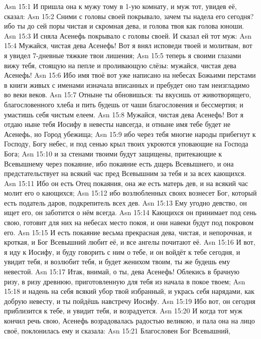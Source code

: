 \vs Asn 15:1
И пришла она к мужу тому в 1-ую комнату,
и муж тот, увидев её, сказал:
\vs Asn 15:2
Сними с головы своей покрывало,
зачем ты надела его сегодня?
ибо ты до сей поры чистая и скромная дева,
и голова твоя как голова юноши.
\vs Asn 15:3
И сняла Асенефь покрывало с головы своей.
И сказал ей тот муж:
\vs Asn 15:4
Мужайся, чистая дева Асенефь!
Вот я внял исповеди твоей и молитвам,
вот я увидел 7-дневные тяжкие твои лишения;
\vs Asn 15:5
теперь я своими глазами вижу тебя,
стоящую на пепле и проливающую слёзы:
мужайся, чистая дева Асенефь!
\vs Asn 15:6
Ибо имя твоё вот уже написано
на небесах Божьими перстами
в книги живых с именами изначала вписанных
и пребудет оно там неизгладимо во веки веков.
\vs Asn 15:7
Отныне ты обновишься:
ты вкусишь от животворящего,
благословенного хлеба
и пить будешь от чаши благословения
и бессмертия;
и умастишь себя чистым елеем.
\vs Asn 15:8
Мужайся, чистая дева Асенефь!
Вот я отдаю ныне тебя Иосифу в невесты навсегда,
и отныне имя тебе будет не Асенефь, но Город убежища;
\vs Asn 15:9
ибо через тебя многие народы прибегнут к Господу,
Богу небес, и под сенью крыл твоих укроются
уповающие на Господа Бога;
\vs Asn 15:10
и за стенами твоими будут защищены,
притекающие к Всевышнему через покаяние,
ибо покаяние есть дщерь Всевышнего,
и она предстательствует на всякий час
пред Всевышним за тебя и за всех кающихся.
\vs Asn 15:11
Ибо он есть Отец покаяния,
она же есть матерь дев, и на всякий час молит его о кающихся;
\vs Asn 15:12
ибо возлюбленных своих
вознесет Бог, который есть податель даров, подкрепитель всех дев.
\vs Asn 15:13
Ему угодно девство, он ищет его,
он заботится о нём всегда.
\vs Asn 15:14
Кающихся он принимает под сень свою,
готовит для них на небесах место покоя, и они навеки будут под
покровом его.
\vs Asn 15:15
И есть покаяние весьма прекрасная дева,
чистая, и непорочная, и кроткая, и Бог Всевышний любит её, и
все ангелы почитают её.
\vs Asn 15:16
И вот, я иду к Иосифу,
и буду говорить с ним о тебе, и он войдёт к тебе сегодня, и увидит тебя, и
возлюбит тебя, и будет женихом твоим, ты же будешь ему невестой.
\vs Asn 15:17
Итак, внимай, о ты, дева Асенефь!
Облекись в брачную ризу, в ризу древнюю, приготовленную для тебя из
начала в покое твоем;
\vs Asn 15:18
и надень на себя всякий убор твой избранный,
и укрась себя нарядами, как добрую невесту, и ты пойдёшь навстречу Иосифу.
\vs Asn 15:19
Ибо вот, он сегодня приблизится к тебе,
и увидит тебя, и возрадуется.
\vs Asn 15:20
И когда тот муж кончил речь свою,
Асенефь возрадовалась радостью великою,
и пала она на лицо своё,
поклонилась ему и сказала:
\vs Asn 15:21
Благословен Бог Всевышний,
